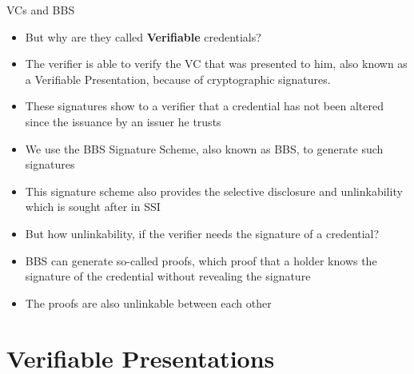 \documentclass[
	english,%
	authorontitle=true,
	]{bfhbeamer}
\begin{document}
\begin{frame}{VCs and BBS}
    \begin{itemize}
        \item But why are they called \textbf{Verifiable} credentials?
        \item The verifier is able to verify the VC that was presented to him, also known as a Verifiable Presentation, because of cryptographic signatures.
        \item These signatures show to a verifier that a credential has not been altered since the issuance by an issuer he trusts
        \item We use the BBS Signature Scheme, also known as BBS, to generate such signatures
        \item This signature scheme also provides the selective disclosure and unlinkability which is sought after in SSI
        \item But how unlinkability, if the verifier needs the signature of a credential?
        \item BBS can generate so-called proofs, which proof that a holder knows the signature of the credential without revealing the signature
        \item The proofs are also unlinkable between each other
    \end{itemize}
\end{frame}

\section{Verifiable Presentations}
\end{document}
